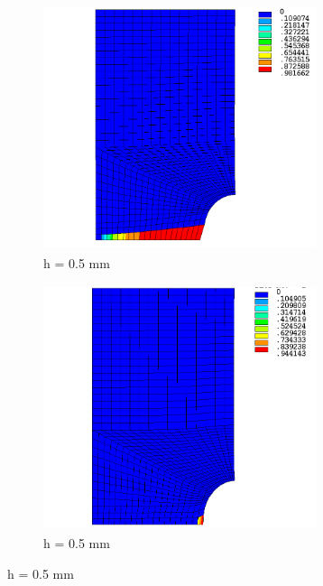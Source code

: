 \documentclass[12pt,twoside]{report}
\begin{document}
\begin{figure}[htbp!]\ContinuedFloat 
     \begin{subfigure}{0.4\textwidth}
         \includegraphics[width=8cm,height=7.2cm,keepaspectratio]{25.d1-0.5-r.png}
         \caption{h = 0.5 mm}
         \label{fig:d1-0.5-r}
     \end{subfigure}   
     \hspace{1.8cm}
     \begin{subfigure}{0.4\textwidth}
         \includegraphics[width=8cm,height=7.2cm,keepaspectratio]{25.d1-0.5-nr.png}
         \caption{h = 0.5 mm}
         \label{fig:d1-0.5-nr}
     \end{subfigure}
\end{figure}
\FloatBarrier
\end{document}
